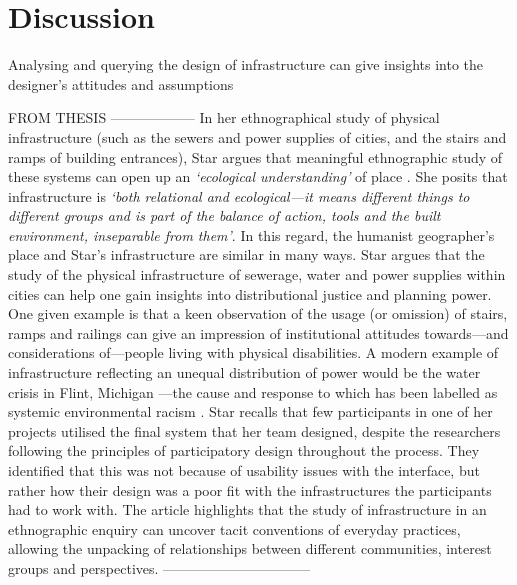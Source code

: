 \section{Discussion}

Analysing and querying the design of infrastructure can give insights into the designer's attitudes and assumptions

FROM THESIS ------------------
In her ethnographical study of physical infrastructure (such as the sewers and power supplies of cities, and the stairs and ramps of building entrances), Star argues that meaningful ethnographic study of these systems can open up an \textit{`ecological understanding'} of place \citep{Star1999}. She posits that infrastructure is \textit{`both relational and ecological---it means different things to different groups and is part of the balance of action, tools and the built environment, inseparable from them'}. In this regard, the humanist geographer's place and Star's infrastructure are similar in many ways. Star argues that the study of the physical infrastructure of sewerage, water and power supplies within cities can help one gain insights into distributional justice and planning power. One given example is that a keen observation of the usage (or omission) of stairs, ramps and railings can give an impression of institutional attitudes towards---and considerations of---people living with physical disabilities. A modern example of infrastructure reflecting an unequal distribution of power would be the water crisis in Flint, Michigan \citep{Clark2018}---the cause and response to which has been labelled as systemic environmental racism \citep{MichiganCivilRightsCommission2017a}. Star recalls that few participants in one of her projects utilised the final system that her team designed, despite the researchers following the principles of participatory design throughout the process. They identified that this was not because of usability issues with the interface, but rather how their design was a poor fit with the infrastructures the participants had to work with. The article highlights that the study of infrastructure in an ethnographic enquiry can uncover tacit conventions of everyday practices, allowing the unpacking of relationships between different communities, interest groups and perspectives.
--------------------------------